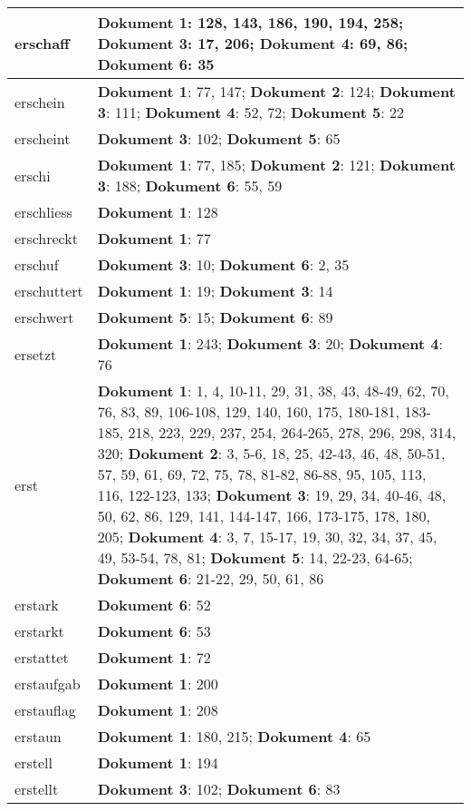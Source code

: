 \documentclass[a5paper]{article}
\begin{document}
\begin{longtable}[l]{|l|p{3in}|}
\hline
erschaff & \textbf{Dokument 1}: 128, 143, 186, 190, 194, 258; \textbf{Dokument 3}: 17, 206; \textbf{Dokument 4}: 69, 86; \textbf{Dokument 6}: 35 \\
\hline
erschein & \textbf{Dokument 1}: 77, 147; \textbf{Dokument 2}: 124; \textbf{Dokument 3}: 111; \textbf{Dokument 4}: 52, 72; \textbf{Dokument 5}: 22 \\
\hline
erscheint & \textbf{Dokument 3}: 102; \textbf{Dokument 5}: 65 \\
\hline
erschi & \textbf{Dokument 1}: 77, 185; \textbf{Dokument 2}: 121; \textbf{Dokument 3}: 188; \textbf{Dokument 6}: 55, 59 \\
\hline
erschliess & \textbf{Dokument 1}: 128 \\
\hline
erschreckt & \textbf{Dokument 1}: 77 \\
\hline
erschuf & \textbf{Dokument 3}: 10; \textbf{Dokument 6}: 2, 35 \\
\hline
erschuttert & \textbf{Dokument 1}: 19; \textbf{Dokument 3}: 14 \\
\hline
erschwert & \textbf{Dokument 5}: 15; \textbf{Dokument 6}: 89 \\
\hline
ersetzt & \textbf{Dokument 1}: 243; \textbf{Dokument 3}: 20; \textbf{Dokument 4}: 76 \\
\hline
erst & \textbf{Dokument 1}: 1, 4, 10-11, 29, 31, 38, 43, 48-49, 62, 70, 76, 83, 89, 106-108, 129, 140, 160, 175, 180-181, 183-185, 218, 223, 229, 237, 254, 264-265, 278, 296, 298, 314, 320; \textbf{Dokument 2}: 3, 5-6, 18, 25, 42-43, 46, 48, 50-51, 57, 59, 61, 69, 72, 75, 78, 81-82, 86-88, 95, 105, 113, 116, 122-123, 133; \textbf{Dokument 3}: 19, 29, 34, 40-46, 48, 50, 62, 86, 129, 141, 144-147, 166, 173-175, 178, 180, 205; \textbf{Dokument 4}: 3, 7, 15-17, 19, 30, 32, 34, 37, 45, 49, 53-54, 78, 81; \textbf{Dokument 5}: 14, 22-23, 64-65; \textbf{Dokument 6}: 21-22, 29, 50, 61, 86 \\
\hline
erstark & \textbf{Dokument 6}: 52 \\
\hline
erstarkt & \textbf{Dokument 6}: 53 \\
\hline
erstattet & \textbf{Dokument 1}: 72 \\
\hline
erstaufgab & \textbf{Dokument 1}: 200 \\
\hline
erstauflag & \textbf{Dokument 1}: 208 \\
\hline
erstaun & \textbf{Dokument 1}: 180, 215; \textbf{Dokument 4}: 65 \\
\hline
erstell & \textbf{Dokument 1}: 194 \\
\hline
erstellt & \textbf{Dokument 3}: 102; \textbf{Dokument 6}: 83 \\

\end{longtable}
\end{document}
